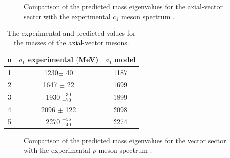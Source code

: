 \documentclass[aps,prd,12pt,nofootinbib]{revtex4}
\begin{document}
\begin{figure}[htb]
\caption{Comparison of the predicted mass eigenvalues for the axial-vector sector with the experimental $a_1$ meson spectrum \cite{PDG}.}
\end{figure}

\begin{table}[htb]
\center
\begin{tabular}{| c || c | c  |}
\hline
n & $a_1$ experimental (MeV) & $a_1$ model \\
\hline
1 & 1230$\pm$ 40 &	    	1187	 \\
2 & 1647 $\pm$ 22 & 	1699	 \\
3 & 1930  $^{+30}_{-70}$ & 1899\\
4 & 2096 $\pm$ 122 &      2098	 \\ 
5 & 2270 $^{+55}_{-40}$  & 2274\\
\hline
\end{tabular}
\caption{The experimental and predicted values for the masses of the axial-vector mesons.}
\label{tabAxial}
\end{table}

\begin{figure}[htb]
\caption{Comparison of the predicted mass eigenvalues for the vector sector with the experimental $\rho$ meson spectrum \cite{PDG}.}
\label{figRho}
\end{figure}
\end{document}
